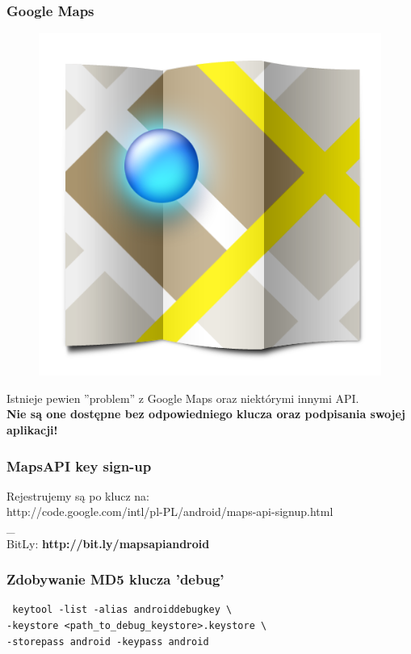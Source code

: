 \documentclass{beamer}
\begin{document}
\begin{frame}\frametitle{Google Maps}

\begin{figure}[tc]
  \centering
  \includegraphics[height=0.45\textheight,keepaspectratio=true]{images/maps_icon}
\end{figure}

Istnieje pewien ''problem'' z Google Maps oraz niektórymi innymi API. \\
\textbf{Nie są one dostępne bez odpowiedniego klucza oraz podpisania swojej aplikacji!}
\end{frame}


\begin{frame}\frametitle{MapsAPI key sign-up}
  \centering Rejestrujemy są po klucz na: \\
  \centering http://code.google.com/intl/pl-PL/android/maps-api-signup.html \\
  _\\
  \centering BitLy: \textbf{http://bit.ly/mapsapiandroid}\\
\end{frame}


\begin{frame}[fragile]\frametitle{Zdobywanie MD5 klucza 'debug'}
\begin{lstlisting}
 keytool -list -alias androiddebugkey \
-keystore <path_to_debug_keystore>.keystore \
-storepass android -keypass android
\end{lstlisting}
\end{frame}
\end{document}
